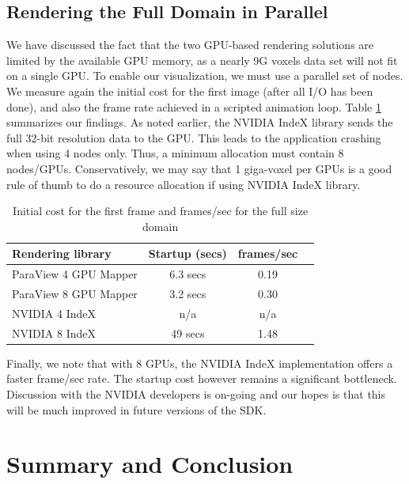 \documentclass[final,5p,times,twocolumn]{elsarticle}
\begin{document}
\subsection{Rendering the Full Domain in Parallel}

We have discussed the fact that the two GPU-based rendering solutions
are limited by the available GPU memory, as a nearly 9G voxels data set will
not fit on a single GPU. To enable our visualization, we must use a parallel 
set of nodes. We measure again the initial cost for the first image
(after all I/O has been done), and also the frame rate achieved in a scripted
animation loop. Table \ref{tab:parallelgpu-tab} summarizes our findings. As noted earlier,
the NVIDIA IndeX library sends the full 32-bit resolution data to the GPU. This
leads to the application crashing when using 4 nodes only. Thus, a minimum
allocation must contain 8 nodes/GPUs. Conservatively, we may say that 1 giga-voxel
per GPUs is a good rule of thumb to do a resource allocation if using NVIDIA IndeX library.

\begin{table}[htb]
  \centering
  \caption{
    Initial cost for the first frame and frames/sec for the full size domain
  }
  \label{tab:parallelgpu-tab}

  \begin{tabular}{lccc}
    \hline
    Rendering library & Startup (secs) & frames/sec\\
    \hline
    ParaView 4 GPU Mapper & 6.3 secs &  0.19 \\
    ParaView 8 GPU Mapper & 3.2 secs &  0.30 \\
    NVIDIA 4 IndeX & n/a &  n/a\\
    NVIDIA 8 IndeX & 49 secs &  1.48\\
    \hline

  \end{tabular}
\end{table}

Finally, we note that with 8 GPUs, the NVIDIA IndeX implementation offers a faster
frame/sec rate. The startup cost however remains a significant bottleneck. Discussion with
the NVIDIA developers is on-going and our hopes is that this will be much improved
in future versions of the SDK.

\section{Summary and Conclusion}
\end{document}
